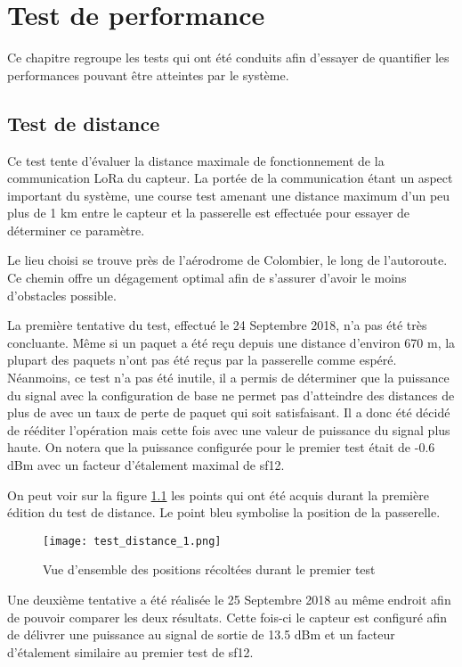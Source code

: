 
\chapter{Test de performance}

Ce chapitre regroupe les tests qui ont été conduits afin d'essayer de quantifier les performances pouvant être atteintes par le système.

\section{Test de distance}

Ce test tente d'évaluer la distance maximale de fonctionnement de la communication LoRa du capteur. La portée de la communication étant un aspect important du système, une course test amenant une distance maximum d'un peu plus de 1 km entre le capteur et la passerelle est effectuée pour essayer de déterminer ce paramètre.

Le lieu choisi se trouve près de l'aérodrome de Colombier, le long de l'autoroute. Ce chemin offre un dégagement optimal afin de s'assurer d'avoir le moins d'obstacles possible.

La première tentative du test, effectué le 24 Septembre 2018, n'a pas été très concluante. Même si un paquet a été reçu depuis une distance d'environ 670 m, la plupart des paquets n'ont pas été reçus par la passerelle comme espéré. Néanmoins, ce test n'a pas été inutile, il a permis de déterminer que la puissance du signal avec la configuration de base ne permet pas d'atteindre des distances de plus de  avec un taux de perte de paquet qui soit satisfaisant. Il a donc été décidé de rééditer l'opération mais cette fois avec une valeur de puissance du signal plus haute. On notera que la puissance configurée pour le premier test était de -0.6 dBm avec un facteur d'étalement maximal de sf12.

On peut voir sur la figure \ref{fig:test_distance_11} les points qui ont été acquis durant la première édition du test de distance. Le point bleu symbolise la position de la passerelle.

\begin{figure}[htb]
\centering 
\texttt{[image: test\_distance\_1.png]} 
\caption{Vue d'ensemble des positions récoltées durant le premier test}
\label{fig:test_distance_11}
\end{figure}

Une deuxième tentative a été réalisée le 25 Septembre 2018 au même endroit afin de pouvoir comparer les deux résultats. Cette fois-ci le capteur est configuré afin de délivrer une puissance au signal de sortie de 13.5 dBm et un facteur d'étalement similaire au premier test de sf12.

